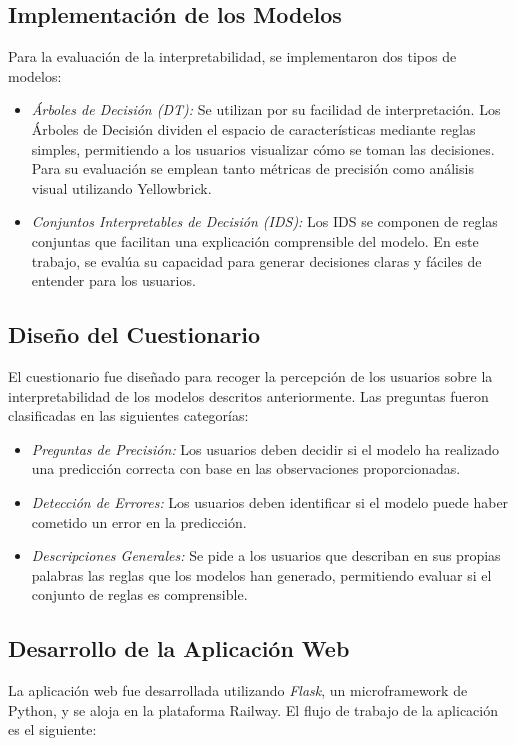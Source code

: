 \subsection{Implementación de los Modelos}
Para la evaluación de la interpretabilidad, se implementaron dos tipos de modelos:

\begin{itemize}
    \item \textit{Árboles de Decisión (DT):} Se utilizan por su facilidad de interpretación. Los Árboles de Decisión dividen el espacio de características mediante reglas simples, permitiendo a los usuarios visualizar cómo se toman las decisiones. Para su evaluación se emplean tanto métricas de precisión como análisis visual utilizando Yellowbrick.
    
    \item \textit{Conjuntos Interpretables de Decisión (IDS):} Los IDS se componen de reglas conjuntas que facilitan una explicación comprensible del modelo. En este trabajo, se evalúa su capacidad para generar decisiones claras y fáciles de entender para los usuarios.
\end{itemize}

\subsection{Diseño del Cuestionario}
El cuestionario fue diseñado para recoger la percepción de los usuarios sobre la interpretabilidad de los modelos descritos anteriormente. Las preguntas fueron clasificadas en las siguientes categorías:

\begin{itemize}
    \item \textit{Preguntas de Precisión:} Los usuarios deben decidir si el modelo ha realizado una predicción correcta con base en las observaciones proporcionadas.
    \item \textit{Detección de Errores:} Los usuarios deben identificar si el modelo puede haber cometido un error en la predicción.
    \item \textit{Descripciones Generales:} Se pide a los usuarios que describan en sus propias palabras las reglas que los modelos han generado, permitiendo evaluar si el conjunto de reglas es comprensible.
\end{itemize}

\subsection{Desarrollo de la Aplicación Web}
La aplicación web fue desarrollada utilizando \textit{Flask}, un microframework de Python, y se aloja en la plataforma Railway. El flujo de trabajo de la aplicación es el siguiente:

